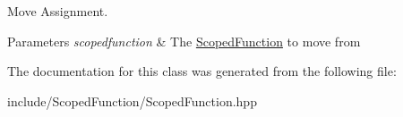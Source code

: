 Move Assignment. 


\begin{DoxyParams}{Parameters}
{\em scopedfunction} & The \hyperlink{classttl_1_1_scoped_function}{Scoped\-Function} to move from \\
\hline
\end{DoxyParams}


The documentation for this class was generated from the following file\-:\begin{DoxyCompactItemize}
\item 
include/\-Scoped\-Function/Scoped\-Function.\-hpp\end{DoxyCompactItemize}
